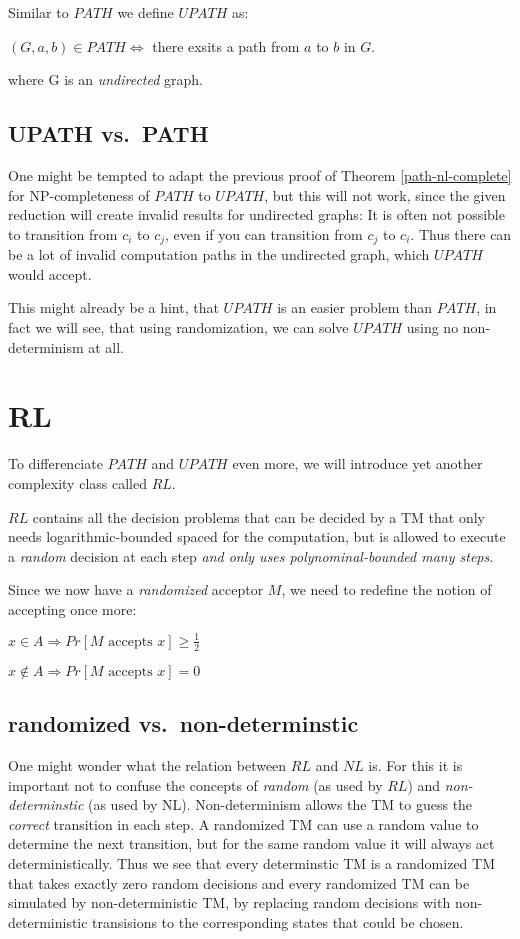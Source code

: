 Similar to $PATH$ we define $UPATH$ as:

$(G, a, b) \in PATH \Leftrightarrow $ there exsits a path from $a$ to
$b$ in $G$.

where G is an \emph{undirected} graph.

\section{UPATH vs.~PATH}\label{upath-vs.path}

One might be tempted to adapt the previous proof of Theorem
\ref{path-nl-complete} for NP-completeness of $PATH$ to $UPATH$, but
this will not work, since the given reduction will create invalid
results for undirected graphs: It is often not possible to transition
from $c_i$ to $c_j$, even if you can transition from $c_j$ to $c_i$.
Thus there can be a lot of invalid computation paths in the undirected
graph, which $UPATH$ would accept.

This might already be a hint, that $UPATH$ is an easier problem than
$PATH$, in fact we will see, that using randomization, we can solve
$UPATH$ using no non-determinism at all.

\chapter{RL}\label{rl}

To differenciate $PATH$ and $UPATH$ even more, we will introduce yet
another complexity class called $RL$.

$RL$ contains all the decision problems that can be decided by a TM that
only needs logarithmic-bounded spaced for the computation, but is
allowed to execute a \emph{random} decision at each step \emph{and only
uses polynominal-bounded many steps}.

Since we now have a \emph{randomized} acceptor $M$, we need to redefine
the notion of accepting once more:

$x \in A \Rightarrow Pr[M \text{ accepts } x] \geq \frac{1}{2}$

$x \not \in A \Rightarrow Pr[M \text{ accepts } x] = 0$

\section{randomized
vs.~non-determinstic}\label{randomized-vs.non-determinstic}

One might wonder what the relation between $RL$ and $NL$ is. For this it
is important not to confuse the concepts of \emph{random} (as used by
$RL$) and \emph{non-determinstic} (as used by NL). Non-determinism
allows the TM to guess the \emph{correct} transition in each step. A
randomized TM can use a random value to determine the next transition,
but for the same random value it will always act deterministically. Thus
we see that every determinstic TM is a randomized TM that takes exactly
zero random decisions and every randomized TM can be simulated by
non-deterministic TM, by replacing random decisions with
non-deterministic transisions to the corresponding states that could be
chosen.

